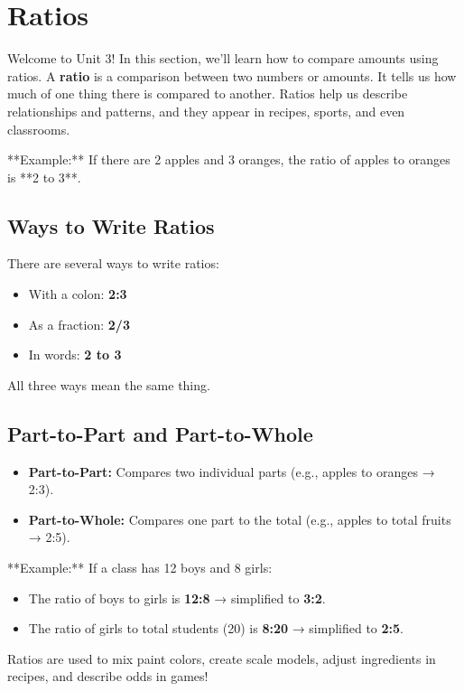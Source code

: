 \cleardoublepage
\section{Ratios}

Welcome to Unit 3! In this section, we'll learn how to compare amounts using ratios. A \textbf{ratio} is a comparison between two numbers or amounts. It tells us how much of one thing there is compared to another. Ratios help us describe relationships and patterns, and they appear in recipes, sports, and even classrooms.

**Example:**  
If there are 2 apples and 3 oranges, the ratio of apples to oranges is **2 to 3**.

\subsection*{Ways to Write Ratios}

There are several ways to write ratios:

\begin{itemize}
  \item With a colon: \textbf{2:3}
  \item As a fraction: \textbf{2/3}
  \item In words: \textbf{2 to 3}
\end{itemize}

All three ways mean the same thing.

\subsection*{Part-to-Part and Part-to-Whole}

\begin{itemize}
  \item \textbf{Part-to-Part:} Compares two individual parts (e.g., apples to oranges → 2:3).
  \item \textbf{Part-to-Whole:} Compares one part to the total (e.g., apples to total fruits → 2:5).
\end{itemize}

**Example:**  
If a class has 12 boys and 8 girls:
\begin{itemize}
  \item The ratio of boys to girls is \textbf{12:8} → simplified to \textbf{3:2}.
  \item The ratio of girls to total students (20) is \textbf{8:20} → simplified to \textbf{2:5}.
\end{itemize}

Ratios are used to mix paint colors, create scale models, adjust ingredients in recipes, and describe odds in games!





